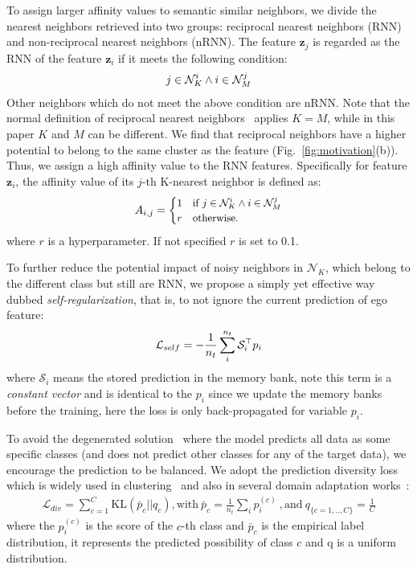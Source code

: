 \documentclass{article}
\begin{document}
To assign larger affinity values to semantic similar neighbors, we divide the nearest neighbors retrieved into two groups: reciprocal nearest neighbors (RNN) and non-reciprocal nearest neighbors (nRNN). The feature $\bm{z}_j$ is regarded as the RNN of the feature $\bm{z}_i$ if it meets the following condition:
\begin{eqnarray}\label{def:rnn}
\small
j \in \mathcal{N}_K^i \wedge i \in \mathcal{N}_M^j
\end{eqnarray}
Other neighbors which do not meet the above condition are nRNN. Note that the normal definition of reciprocal nearest neighbors~\cite{qin2011hello} applies $K=M$, while in this paper $K$ and $M$ can be different.
We find that reciprocal neighbors have a higher potential to belong to the same cluster as the feature (Fig.~\ref{fig:motivation}(b)). Thus, we assign a high affinity value to the RNN features. Specifically for feature $\bm{z}_i$, the affinity value of its $j$-th K-nearest neighbor is defined as:
\begin{eqnarray}\label{def:a}
\small
A_{i, j} =
\begin{cases}
1 & \text{if }j \in \mathcal{N}_K^i \wedge i \in \mathcal{N}_M^j    \\ 
r & \text{otherwise}.
\end{cases} 
\end{eqnarray}
where $r$ is a hyperparameter. If not specified $r$ is set to 0.1. 


To further reduce the potential impact of noisy neighbors in $\mathcal{N}_K$, which belong to the different class but still are RNN, we propose a simply yet effective way dubbed \textit{self-regularization}, that is, to not ignore the current prediction of ego feature:
\begin{eqnarray}\label{eq:self}
\small
    \mathcal{L}_{self}=-\frac{1}{n_t}\sum_{i}^{n_t} \mathcal{S}_i^\top p_i
\end{eqnarray}
where $\mathcal{S}_i$ means the stored prediction in the memory bank, note this term is a \textit{constant vector} and is identical to the $p_i$ since we update the memory banks before the training, {here the loss is only back-propagated for variable $p_i$.}



To avoid the degenerated solution~\cite{ghasedi2017deep,shi2012information} where the model predicts all data as some specific classes (and does not predict other classes for any of the target data), we encourage the prediction to be balanced. We adopt the prediction diversity loss which is widely used in clustering~\cite{ghasedi2017deep,gomes2010discriminative,jabi2019deep} and also in several domain adaptation works~\cite{liang2020we,shi2012information,tang2020unsupervised}:
\begin{eqnarray}\label{eq:div}
\mathcal{L}_{div}=\sum_{c=1}^{C} \textrm{KL}(\bar{p}_c||q_c), \text{with} \ \bar{p}_c=\frac{1}{n_t}\sum_{i} p_{i}^{(c)} \ ,\textrm{and}\  q_{\{c=1,..,C\}}= \frac{1}{C} \end{eqnarray}
where the $p_{i}^{(c)}$ is the score of the $c$-th class and $\bar{p}_c$ is the empirical label distribution, it represents the predicted possibility of class $c$ and q is a uniform distribution.
\end{document}
